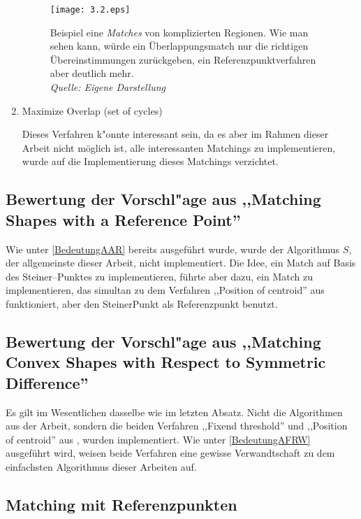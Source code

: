 \begin{enumerate}
\begin{figure}
	\centering
	\texttt{[image: 3.2.eps]}
	\caption[Beispiel für den Vorteil des Overlaping-Match]{Beispiel eine \textit{Matches} von komplizierten Regionen. Wie man sehen kann, würde ein Überlappungsmatch nur die richtigen Übereinstimmungen zurückgeben, ein Referenzpunktverfahren aber deutlich mehr.\\\textit{Quelle: Eigene Darstellung}}
	\label{fig:OverlapVorteil}
\end{figure}


\item Maximize Overlap (set of cycles) 

Dieses Verfahren k"onnte interessant sein, da es aber im  Rahmen dieser Arbeit nicht möglich ist, alle interessanten Matchings zu implementieren, wurde auf die Implementierung dieses Matchings verzichtet.

\end{enumerate}

\subsection[Bewertung der Vorschl"age aus \cite{AAR}]{Bewertung der Vorschl"age aus ,,Matching Shapes with a Reference Point'' \cite{AAR}}

Wie unter \vref{BedeutungAAR} bereits ausgeführt wurde, wurde der Algorithmus $S$, der allgemeinste dieser Arbeit, nicht implementiert. Die Idee, ein Match auf Basis des Steiner--Punktes zu implementieren, führte aber dazu, ein Match zu implementieren, das simultan zu dem Verfahren ,,Position of centroid'' aus \cite{TG} funktioniert, aber den SteinerPunkt als Referenzpunkt benutzt.

\subsection[Bewertung der Vorschl"age aus \cite{AFRW}]{Bewertung der Vorschl"age aus ,,Matching Convex Shapes with Respect to Symmetric Difference'' \cite{AFRW}}

Es gilt im Wesentlichen dasselbe wie  im letzten Absatz. Nicht die Algorithmen aus der Arbeit, sondern die beiden Verfahren ,,Fixend threshold'' und ,,Position of centroid'' aus \cite{TG}, wurden implementiert. Wie unter \vref{BedeutungAFRW} ausgeführt wird, weisen beide Verfahren  eine gewisse Verwandtschaft zu dem einfachsten Algorithmus dieser Arbeiten auf. 


\subsection{Matching mit Referenzpunkten}

